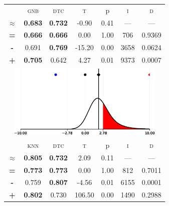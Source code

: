 \begin{tabular}{c||cc||c|c|c||c}
\midrule	&\textsc{gnb} & \textsc{dtc} & \textsc{t} & p & \textsc{i} & \textsc{d}\\
	\color{black} $\approx$ & \color{black} \bfseries 0.683 &\color{black}  \bfseries 0.732 & -0.90 & 0.41 & --- & ---\\\midrule
	{\bfseries\color{black}\tiny=}& \color{black} \bfseries 0.666 & \color{black} \bfseries 0.666 & 0.00 & 1.00 & 706 & \color{black} 0.9369\\
	{\bfseries\color{blue}\tiny-}& \color{blue}  0.691 & \color{blue} \bfseries 0.769 & -15.20 & 0.00 & 3658 & \color{blue} 0.0624\\
	{\bfseries\color{red}\tiny+}& \color{red} \bfseries 0.705 & \color{red}  0.642 & 4.27 & 0.01 & 9373 & \color{red} 0.0007\\
	\bottomrule
	\multicolumn{7}{c}{\includegraphics[width=7.5cm, trim=30 0 30 0]{figures/sonar_2.eps}}\\

\midrule	&\textsc{knn} & \textsc{dtc} & \textsc{t} & p & \textsc{i} & \textsc{d}\\
	\color{black} $\approx$ & \color{black} \bfseries 0.805 &\color{black}  \bfseries 0.732 & 2.09 & 0.11 & --- & ---\\\midrule
	{\bfseries\color{black}\tiny=}& \color{black} \bfseries 0.773 & \color{black} \bfseries 0.773 & 0.00 & 1.00 & 812 & \color{black} 0.7011\\
	{\bfseries\color{blue}\tiny-}& \color{blue}  0.759 & \color{blue} \bfseries 0.807 & -4.56 & 0.01 & 6155 & \color{blue} 0.0001\\
	{\bfseries\color{red}\tiny+}& \color{red} \bfseries 0.802 & \color{red}  0.730 & 106.50 & 0.00 & 1490 & \color{red} 0.2988\\
\bottomrule\end{tabular}


